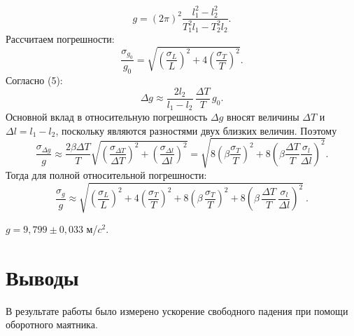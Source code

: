 \documentclass[a4paper]{article}
\begin{document}
\[g=(2\pi)^2\frac{l_1^2-l_2^2}{T_1^2l_1-T_2^2l_2}.\]
Рассчитаем погрешности:
\[
\frac{\sigma_{g_0}}{g_0} = \sqrt{ \left( \frac{\sigma_L}{L} \right)^2 + 4 \left( \frac{\sigma_T}{T} \right)^2 }. 
\]
Согласно (5):
\[\Delta g \approx \frac{2 l_2}{l_1 - l_2} \, \frac{\Delta T}{T} \, g_0 . \]
\noindent
Основной вклад в относительную погрешность $\Delta g$ вносят величины $\Delta T$ и $\Delta l = l_1-l_2$, поскольку являются разностями двух близких величин. Поэтому
\[
\frac{\sigma_{\Delta g}}{g} \approx \frac{2\beta \Delta T}{T} \sqrt{\left(\frac{\sigma_{\Delta T}}{\Delta T}\right)^2 + \left(\frac{\sigma_{\Delta l}}{\Delta l}\right)^2} = \sqrt{8\left(\beta \frac{\sigma_T}{T}\right)^2 + 8\left(\beta \frac{\Delta T}{T} \frac{\sigma_l}{\Delta l}\right)^2}.
\]
Тогда для полной относительной погрешности:
\[
\frac{\sigma_{g}}{g} \approx \sqrt{ \left( \frac{\sigma_{L}}{L} \right)^{2} + 4 \left( \frac{\sigma_{T}}{T} \right)^{2} + 8 \left( \beta \, \frac{\sigma_{T}}{T} \right)^{2} + 8 \left( \beta \, \frac{\Delta T}{T} \, \frac{\sigma_{l}}{\Delta l} \right)^{2} } \ .
\]	

\noindent $ g = 9,799 \pm 0,033$ м/$c^2$.

\section{Выводы}
В результате работы было измерено ускорение свободного падения при помощи оборотного маятника.
\end{document}
